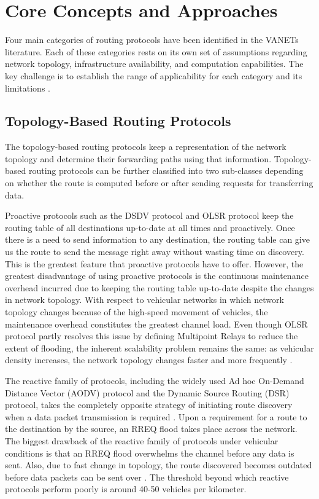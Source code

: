 \documentclass[12pt]{article}
\begin{document}
\section{Core Concepts and Approaches}

Four main categories of routing protocols have been identified in the VANETs literature. Each of these categories rests on its own set of assumptions regarding network topology, infrastructure availability, and computation capabilities. The key challenge is to establish the range of applicability for each category and its limitations \cite{li2007routing}.

\subsection{Topology-Based Routing Protocols}

The topology-based routing protocols keep a representation of the network topology and determine their forwarding paths using that information. Topology-based routing protocols can be further classified into two sub-classes depending on whether the route is computed before or after sending requests for transferring data.

Proactive protocols such as the DSDV protocol and OLSR protocol keep the routing table of all destinations up-to-date at all times and proactively. Once there is a need to send information to any destination, the routing table can give us the route to send the message right away without wasting time on discovery. This is the greatest feature that proactive protocols have to offer. However, the greatest disadvantage of using proactive protocols is the continuous maintenance overhead incurred due to keeping the routing table up-to-date despite the changes in network topology. With respect to vehicular networks in which network topology changes because of the high-speed movement of vehicles, the maintenance overhead constitutes the greatest channel load. Even though OLSR protocol partly resolves this issue by defining Multipoint Relays to reduce the extent of flooding, the inherent scalability problem remains the same: as vehicular density increases, the network topology changes faster and more frequently \cite{perkins1994dsdv}.

The reactive family of protocols, including the widely used Ad hoc On-Demand Distance Vector (AODV) protocol and the Dynamic Source Routing (DSR) protocol, takes the completely opposite strategy of initiating route discovery when a data packet transmission is required \cite{perkins1999aodv}. Upon a requirement for a route to the destination by the source, an RREQ flood takes place across the network. The biggest drawback of the reactive family of protocols under vehicular conditions is that an RREQ flood overwhelms the channel before any data is sent. Also, due to fast change in topology, the route discovered becomes outdated before data packets can be sent over \cite{johnson1996dsr}. The threshold beyond which reactive protocols perform poorly is around 40-50 vehicles per kilometer.
\end{document}
